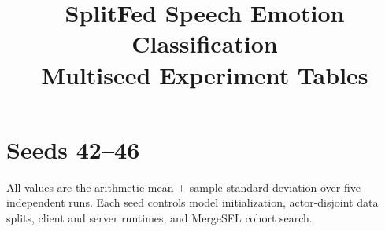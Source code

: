 \documentclass{article}
\title{SplitFed Speech Emotion Classification\\Multiseed Experiment Tables}
\author{}
\date{}
\begin{document}
\maketitle

\section*{Seeds 42--46}

All values are the arithmetic mean $\pm$ sample standard deviation over five
independent runs. Each seed controls model initialization, actor-disjoint data
splits, client and server runtimes, and MergeSFL cohort search.






\end{document}
